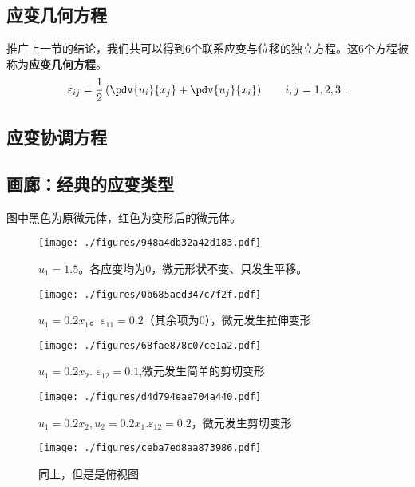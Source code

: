 \subsection{应变几何方程}
推广上一节的结论，我们共可以得到$6$个联系应变与位移的独立方程。这$6$个方程被称为\textbf{应变几何方程}。
\begin{equation}
\varepsilon_{ij} = \frac{1}{2}\left(\pdv{u_i}{x_j}+\pdv{u_j}{x_i}\right) \qquad i,j=1,2,3~.
\end{equation}

\subsection{应变协调方程}

\subsection{画廊：经典的应变类型}
图中黑色为原微元体，红色为变形后的微元体。
\begin{figure}[ht]
\centering
\texttt{[image: ./figures/948a4db32a42d183.pdf]}
\caption{$u_1=1.5$。各应变均为$0$，微元形状不变、只发生平移。} \label{fig_Strain_9}
\end{figure}

\begin{figure}[ht]
\centering
\texttt{[image: ./figures/0b685aed347c7f2f.pdf]}
\caption{$u_1=0.2x_1$。$\varepsilon_{11}=0.2$（其余项为$0$），微元发生拉伸变形} \label{fig_Strain_5}
\end{figure}

\begin{figure}[ht]
\centering
\texttt{[image: ./figures/68fae878c07ce1a2.pdf]}
\caption{$u_1=0.2x_2$. $\varepsilon_{12}=0.1$,微元发生简单的剪切变形} \label{fig_Strain_6}
\end{figure}

\begin{figure}[ht]
\centering
\texttt{[image: ./figures/d4d794eae704a440.pdf]}
\caption{$u_1=0.2x_2, u_2=0.2x_1$.$\varepsilon_{12}=0.2$，微元发生剪切变形} \label{fig_Strain_8}
\end{figure}
\begin{figure}[ht]
\centering
\texttt{[image: ./figures/ceba7ed8aa873986.pdf]}
\caption{同上，但是是俯视图} \label{fig_Strain_7}
\end{figure}

